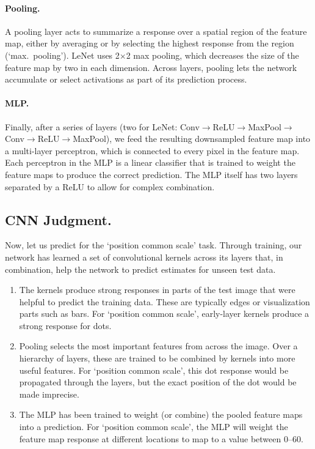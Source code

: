 \documentclass[journal]{vgtc}        %
\begin{document}
{\paragraph{Pooling.} A pooling layer acts to summarize a response over a spatial region of the feature map, either by averaging or by selecting the highest response from the region (`max.~pooling'). LeNet uses 2$\times$2 max pooling, which decreases the size of the feature map by two in each dimension. Across layers, pooling lets the network accumulate or select activations as part of its prediction process.

\paragraph{MLP.} Finally, after a series of layers (two for LeNet: Conv$\rightarrow$ReLU$\rightarrow$MaxPool$\rightarrow$Conv$\rightarrow$ReLU$\rightarrow$MaxPool), we feed the resulting downsampled feature map into a multi-layer perceptron, which is connected to every pixel in the feature map. Each perceptron in the MLP is a linear classifier that is trained to weight the feature maps to produce the correct prediction. The MLP itself has two layers separated by a ReLU to allow for complex combination.

\subsection{CNN Judgment.} Now, let us predict for the `position common scale' task. Through training, our network has learned a set of convolutional kernels across its layers that, in combination, help the network to predict estimates for unseen test data.
\begin{enumerate}[label=\arabic*.,itemsep=0.5pt, topsep=1pt, parsep=0.5pt]
    \item The kernels produce strong responses in parts of the test image that were helpful to predict the training data. These are typically edges or visualization parts such as bars. For `position common scale', early-layer kernels produce a strong response for dots.
    \item Pooling selects the most important features from across the image. Over a hierarchy of layers, these are trained to be combined by kernels into more useful features. For `position common scale', this dot response would be propagated through the layers, but the exact position of the dot would be made imprecise.
    \item The MLP has been trained to weight (or combine) the pooled feature maps into a prediction. For `position common scale', the MLP will weight the feature map response at different locations to map to a value between 0--60.
\end{enumerate}

}
\end{document}
